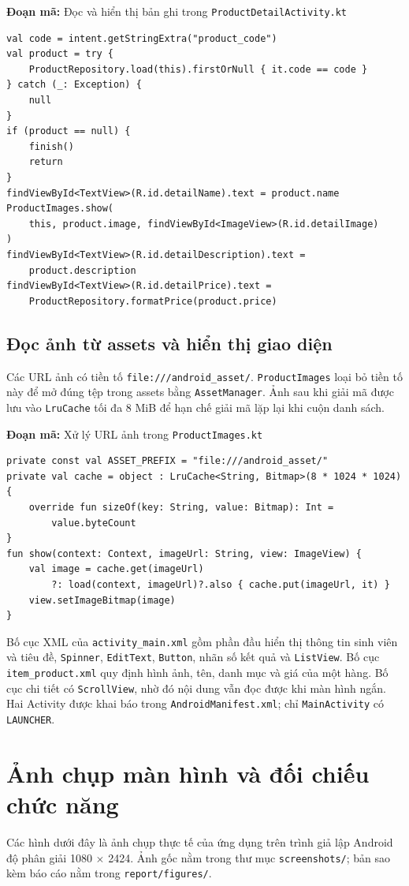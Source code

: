 \documentclass[12pt,a4paper]{article}
\newcommand{\codepath}[1]{\nolinkurl{#1}}
\newcommand{\codecaption}[1]{\par\noindent\textbf{Đoạn mã:} #1\par\vspace{3pt}}
\begin{document}
\codecaption{Đọc và hiển thị bản ghi trong \codepath{ProductDetailActivity.kt}}
\begin{Verbatim}[fontsize=\small,breaklines=true,frame=single]
val code = intent.getStringExtra("product_code")
val product = try {
    ProductRepository.load(this).firstOrNull { it.code == code }
} catch (_: Exception) {
    null
}
if (product == null) {
    finish()
    return
}
findViewById<TextView>(R.id.detailName).text = product.name
ProductImages.show(
    this, product.image, findViewById<ImageView>(R.id.detailImage)
)
findViewById<TextView>(R.id.detailDescription).text =
    product.description
findViewById<TextView>(R.id.detailPrice).text =
    ProductRepository.formatPrice(product.price)
\end{Verbatim}

\subsection{Đọc ảnh từ assets và hiển thị giao diện}
Các URL ảnh có tiền tố \texttt{file:///android\_asset/}. \texttt{ProductImages}
loại bỏ tiền tố này để mở đúng tệp trong assets bằng \texttt{AssetManager}.
Ảnh sau khi giải mã được lưu vào \texttt{LruCache} tối đa 8 MiB để hạn chế
giải mã lặp lại khi cuộn danh sách.

\codecaption{Xử lý URL ảnh trong \codepath{ProductImages.kt}}
\begin{Verbatim}[fontsize=\small,breaklines=true,frame=single]
private const val ASSET_PREFIX = "file:///android_asset/"
private val cache = object : LruCache<String, Bitmap>(8 * 1024 * 1024) {
    override fun sizeOf(key: String, value: Bitmap): Int =
        value.byteCount
}
fun show(context: Context, imageUrl: String, view: ImageView) {
    val image = cache.get(imageUrl)
        ?: load(context, imageUrl)?.also { cache.put(imageUrl, it) }
    view.setImageBitmap(image)
}
\end{Verbatim}

\noindent Bố cục XML của \texttt{activity\_main.xml} gồm phần đầu hiển thị thông tin
sinh viên và tiêu đề, \texttt{Spinner}, \texttt{EditText}, \texttt{Button},
nhãn số kết quả và \texttt{ListView}. Bố cục \texttt{item\_product.xml} quy định
hình ảnh, tên, danh mục và giá của một hàng. Bố cục chi tiết có
\texttt{ScrollView}, nhờ đó nội dung vẫn đọc được khi màn hình ngắn.
Hai Activity được khai báo trong \codepath{AndroidManifest.xml}; chỉ
\texttt{MainActivity} có \texttt{LAUNCHER}.

\section{Ảnh chụp màn hình và đối chiếu chức năng}
Các hình dưới đây là ảnh chụp thực tế của ứng dụng trên trình giả lập Android
độ phân giải 1080 $\times$ 2424. Ảnh gốc nằm trong thư mục
\codepath{screenshots/}; bản sao kèm báo cáo nằm trong \codepath{report/figures/}.
\end{document}
